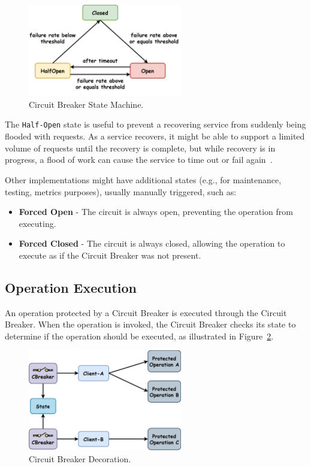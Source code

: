 \begin{figure}[!htb]
    \centering
    \includegraphics[width=0.6\textwidth]{../figures/05_cbreaker-states}
    \caption{Circuit Breaker State Machine.}
    \label{fig:circuit-breaker-state-machine}
\end{figure}

The \texttt{Half-Open} state is useful to prevent a recovering service from suddenly being flooded with requests.
As a service recovers, it might be able to support a limited volume of requests until the recovery is complete,
but while recovery is in progress, a flood of work can cause the service
to time out or fail again~\cite{microsoft-cbreaker-pattern}.

Other implementations might have additional states (e.g., for maintenance, testing, metrics purposes), usually manually triggered, such as:

\begin{itemize}
    \item \textbf{Forced Open} - The circuit is always open, preventing the operation from executing.
    \item \textbf{Forced Closed} - The circuit is always closed, allowing the operation to execute as if the Circuit Breaker was not present.
\end{itemize}

\subsection{Operation Execution}\label{subsec:cbreaker-operation-execution}

An operation protected by a Circuit Breaker is executed through the Circuit Breaker.
When the operation is invoked, the Circuit Breaker checks its state to determine if the operation should be executed,
as illustrated in Figure~\ref{fig:cbreaker-decoration}.

\begin{figure}[!htb]
    \centering
    \includegraphics[width=0.6\textwidth]{../figures/05_cbreaker-decoration}
    \caption{Circuit Breaker Decoration.}
    \label{fig:cbreaker-decoration}
\end{figure}

